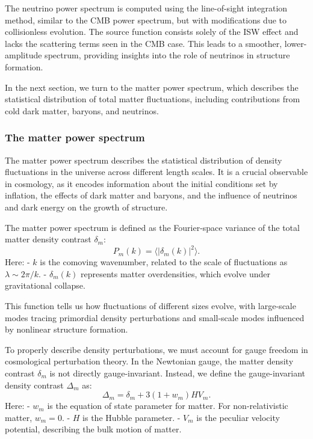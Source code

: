 \documentclass{aa}
\begin{document}
The neutrino power spectrum is computed using the line-of-sight integration method, similar to the CMB power spectrum, but with modifications due to collisionless evolution. The source function consists solely of the ISW effect and lacks the scattering terms seen in the CMB case. This leads to a smoother, lower-amplitude spectrum, providing insights into the role of neutrinos in structure formation.  

In the next section, we turn to the matter power spectrum, which describes the statistical distribution of total matter fluctuations, including contributions from cold dark matter, baryons, and neutrinos.
\color{black}






\subsubsection{The matter power spectrum}
\color{Plum}
The matter power spectrum describes the statistical distribution of density fluctuations in the universe across different length scales. It is a crucial observable in cosmology, as it encodes information about the initial conditions set by inflation, the effects of dark matter and baryons, and the influence of neutrinos and dark energy on the growth of structure.  

The matter power spectrum is defined as the Fourier-space variance of the total matter density contrast $\delta_m$:
\begin{equation}
P_m(k) = \langle |\delta_m(k)|^2 \rangle.
\end{equation}
Here:  
- $k$ is the comoving wavenumber, related to the scale of fluctuations as $\lambda \sim 2\pi/k$.  
- $\delta_m(k)$ represents matter overdensities, which evolve under gravitational collapse.  

This function tells us how fluctuations of different sizes evolve, with large-scale modes tracing primordial density perturbations and small-scale modes influenced by nonlinear structure formation.

To properly describe density perturbations, we must account for gauge freedom in cosmological perturbation theory. In the Newtonian gauge, the matter density contrast $\delta_m$ is not directly gauge-invariant. Instead, we define the gauge-invariant density contrast $\Delta_m$ as:
\begin{equation}
\Delta_m = \delta_m + 3(1 + w_m) H V_m.
\end{equation}
Here:  
- $w_m$ is the equation of state parameter for matter. For non-relativistic matter, $w_m = 0$.  
- $H$ is the Hubble parameter.  
- $V_m$ is the peculiar velocity potential, describing the bulk motion of matter.  
\end{document}
